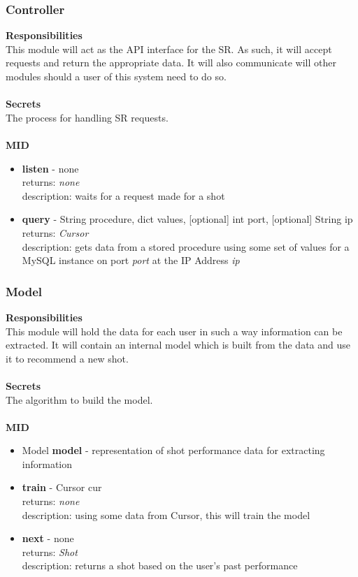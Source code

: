 \documentclass[11pt]{article}
\begin{document}
\subsubsection*{Controller}
\textbf{Responsibilities} \\
This module will act as the API interface for the SR. As such, it will accept requests and return the appropriate data. It will also communicate will other modules should a user of this system need to do so. \\ \\
\textbf{Secrets} \\
The process for handling SR requests. \\ \\
\textbf{MID}
\begin{itemize}
\item \textbf{listen} - none \\ returns: \textit{none} \\ description: waits for a request made for a shot
\item \textbf{query} - String procedure,  dict values, [optional] int port, [optional] String ip \\ returns: \textit{Cursor} \\ description: gets data from a stored procedure using some set of values for a MySQL instance on port \textit{port} at the IP Address \textit{ip}
\end{itemize}

\subsubsection*{Model}
\textbf{Responsibilities} \\
This module will hold the data for each user in such a way information can be extracted. It will contain an internal model which is built from the data and use it to recommend a new shot. \\ \\
\textbf{Secrets} \\
The algorithm to build the model. \\ \\
\textbf{MID}
\begin{itemize}
\item Model \textbf{model} - representation of shot performance data for extracting information
\item \textbf{train} - Cursor cur \\ returns: \textit{none} \\ description: using some data from Cursor, this will train the model
\item \textbf{next} - none \\ returns: \textit{Shot} \\ description: returns a shot based on the user's past performance
\end{itemize}
\end{document}
